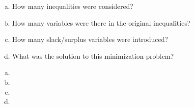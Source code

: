 \documentclass[11pt,letterpaper]{article}
\begin{document}
\begin{enumerate}[(a)]
\item How many inequalities were considered?
\item How many variables were there in the original inequalities?
\item How many slack/surplus variables were introduced?
\item What was the solution to this minimization problem?
\end{enumerate} \pspace

\sol 
\begin{enumerate}[(a)]
\item 
\item 
\item 
\item 
\end{enumerate}
\end{document}
